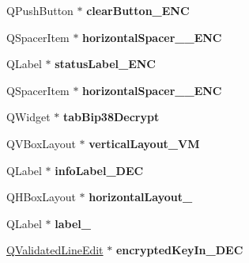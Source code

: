\begin{DoxyCompactItemize}
\item 
\mbox{\label{class_ui___bip38_tool_dialog_aaea61b1a5fa2f2492d85bf75a0a3eae1}} 
Q\+Push\+Button $\ast$ {\bfseries clear\+Button\+\_\+\+E\+NC}
\item 
\mbox{\label{class_ui___bip38_tool_dialog_a9499636c5c9634def4777033dac044aa}} 
Q\+Spacer\+Item $\ast$ {\bfseries horizontal\+Spacer\+\_\+\_\+\+E\+NC}
\item 
\mbox{\label{class_ui___bip38_tool_dialog_a163fa1ea73f61e82a4b90a2949a63f93}} 
Q\+Label $\ast$ {\bfseries status\+Label\+\_\+\+E\+NC}
\item 
\mbox{\label{class_ui___bip38_tool_dialog_a8b0a12c361bc62bc4b15efc7194dfbb3}} 
Q\+Spacer\+Item $\ast$ {\bfseries horizontal\+Spacer\+\_\+\_\+\+E\+NC}
\item 
\mbox{\label{class_ui___bip38_tool_dialog_a1d4cb721cb7fe9fe775fb84640950cd3}} 
Q\+Widget $\ast$ {\bfseries tab\+Bip38\+Decrypt}
\item 
\mbox{\label{class_ui___bip38_tool_dialog_a214d83b595ecbb0d49d6890b74a89810}} 
Q\+V\+Box\+Layout $\ast$ {\bfseries vertical\+Layout\+\_\+\+VM}
\item 
\mbox{\label{class_ui___bip38_tool_dialog_a20b8352d7c5bc85f68ca43a02ac2ab9b}} 
Q\+Label $\ast$ {\bfseries info\+Label\+\_\+\+D\+EC}
\item 
\mbox{\label{class_ui___bip38_tool_dialog_a1a7680d6c209a8069d8e84f39d0da489}} 
Q\+H\+Box\+Layout $\ast$ {\bfseries horizontal\+Layout\+\_}
\item 
\mbox{\label{class_ui___bip38_tool_dialog_a4792755a84c81c505f5ecea15c77ff6f}} 
Q\+Label $\ast$ {\bfseries label\+\_}
\item 
\mbox{\label{class_ui___bip38_tool_dialog_ad6db4dc65f680af50519e81b6554fd81}} 
\mbox{\hyperlink{class_q_validated_line_edit}{Q\+Validated\+Line\+Edit}} $\ast$ {\bfseries encrypted\+Key\+In\+\_\+\+D\+EC}

\end{DoxyCompactItemize}
